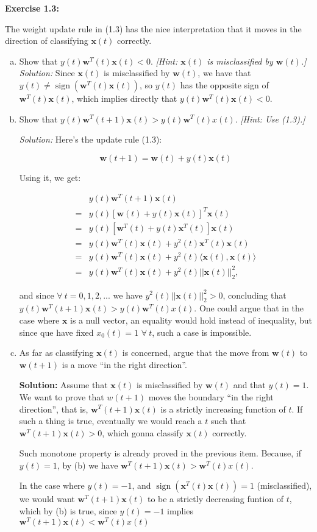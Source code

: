 \documentclass[12pt,letterpaper]{article}
\newcommand{\bx}{\boldsymbol{x}}
\newcommand{\bw}{\boldsymbol{w}}
\newcommand{\sign}{\operatorname{sign}}
\begin{document}
	\textbf{Exercise 1.3:}\cite{yaser2012learning} 
	
	The weight update rule in (1.3) has the nice interpretation that it moves in the direction of classifying $\bx(t)$ correctly. 
	\begin{enumerate}[(a)]
		\item Show that $y(t)\bw^{T}(t)\bx(t)<0.$ \emph{[Hint: $\bx(t)$ is misclassified by $\bw(t)$.]}
		\subitem \textit{Solution:}
		Since $\bx(t)$ is misclassified by $\bw(t)$, we have that $y(t)\neq\sign(\bw^{T}(t)\bx(t))$, so $y(t)$ has the opposite sign of $\bw^{T}(t)\bx(t)$, which implies directly that $y(t)\bw^{T}(t)\bx(t)<0.$
		
		\item Show that $y(t)\bw^{T}(t+1)\bx(t)>y(t)\bw^{T}(t)x(t)$. \emph{[Hint: Use (1.3).]}
		
		\subitem \textit{Solution:}
			Here's the update rule (1.3): 
			
			$$\bw(t+1)=\bw(t)+y(t)\bx(t)$$
			
			Using it, we get:
			
			\begin{align*}
				 &y(t)\bw^{T}(t+1)\bx(t)\\
				=&y(t)[\bw(t)+y(t)\bx(t)]^{T}\bx(t)\\
				=&y(t)[\bw^{T}(t)+y(t)\bx^{T}(t)]\bx(t)\\
				=&y(t)\bw^{T}(t)\bx(t)+y^2(t)\bx^{T}(t)\bx(t)\\
				=&y(t)\bw^{T}(t)\bx(t)+y^2(t)\langle\bx(t),\bx(t)\rangle\\
				=&y(t)\bw^{T}(t)\bx(t)+y^2(t)||\bx(t)||_2^2,
			\end{align*}
			
			and since $\forall ~t=0,1,2,...$ we have $y^2(t)||\bx(t)||_2^2>0$, concluding that $y(t)\bw^{T}(t+1)\bx(t)>y(t)\bw^{T}(t)x(t)$. One could argue that in the case where $\bx$ is a null vector, an equality would hold instead of inequality, but since que have fixed $x_0(t)=1$ $\forall ~t$, such a case is impossible.
		
		\item As far as classifying $\bx(t)$ is concerned, argue that the move from $\bw(t)$ to $\bw(t+1)$ is a move ``in the right direction''.
		
		\subitem \textbf{Solution:} Assume that $\bx(t)$ is misclassified by $\bw(t)$ and that $y(t)=1$. We want to prove that $w(t+1)$ moves the boundary ``in the right direction'', that is, $\bw^{T}(t+1)\bx(t)$ is a strictly increasing function of $t$. If such a thing is true, eventually we would reach a $t$ such that $\bw^{T}(t+1)\bx(t)>0$, which gonna classify $\bx(t)$ correctly.
		
		Such monotone property is already proved in the previous item. Because, if $y(t)=1$, by (b) we have $\bw^{T}(t+1)\bx(t)>\bw^{T}(t)x(t)$.
		
		In the case where $y(t)=-1$, and $\sign(\bx^{T}(t)\bx(t))=1$ (misclassified), we would want $\bw^{T}(t+1)\bx(t)$ to be a strictly decreasing funtion of $t$, which by (b) is true, since $y(t)=-1$ implies $\bw^{T}(t+1)\bx(t)<\bw^{T}(t)x(t)$
		
		 
	\end{enumerate}
	
\newpage



\end{document}
